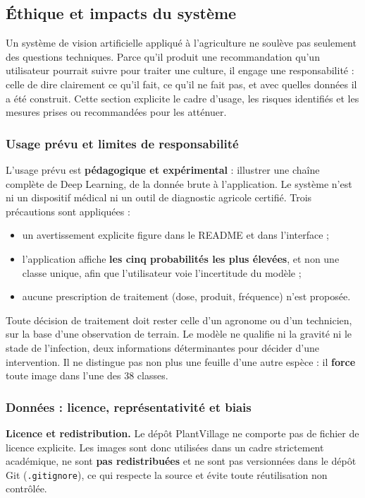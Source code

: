 \documentclass[10pt,a4paper]{article}
\begin{document}
\subsection{Éthique et impacts du système}

Un système de vision artificielle appliqué à l'agriculture ne soulève pas seulement des questions techniques. Parce qu'il produit une recommandation qu'un utilisateur pourrait suivre pour traiter une culture, il engage une responsabilité : celle de dire clairement ce qu'il fait, ce qu'il ne fait pas, et avec quelles données il a été construit. Cette section explicite le cadre d'usage, les risques identifiés et les mesures prises ou recommandées pour les atténuer.

\subsubsection{Usage prévu et limites de responsabilité}

L'usage prévu est \textbf{pédagogique et expérimental} : illustrer une chaîne complète de Deep Learning, de la donnée brute à l'application. Le système n'est ni un dispositif médical ni un outil de diagnostic agricole certifié. Trois précautions sont appliquées :

\begin{itemize}
\item un avertissement explicite figure dans le README et dans l'interface ;
\item l'application affiche \textbf{les cinq probabilités les plus élevées}, et non une classe unique, afin que l'utilisateur voie l'incertitude du modèle ;
\item aucune prescription de traitement (dose, produit, fréquence) n'est proposée.
\end{itemize}

Toute décision de traitement doit rester celle d'un agronome ou d'un technicien, sur la base d'une observation de terrain. Le modèle ne qualifie ni la gravité ni le stade de l'infection, deux informations déterminantes pour décider d'une intervention. Il ne distingue pas non plus une feuille d'une autre espèce : il \textbf{force} toute image dans l'une des 38 classes.

\subsubsection{Données : licence, représentativité et biais}

\textbf{Licence et redistribution.} Le dépôt PlantVillage ne comporte pas de fichier de licence explicite. Les images sont donc utilisées dans un cadre strictement académique, ne sont \textbf{pas redistribuées} et ne sont pas versionnées dans le dépôt Git (\texttt{.gitignore}), ce qui respecte la source et évite toute réutilisation non contrôlée.
\end{document}
